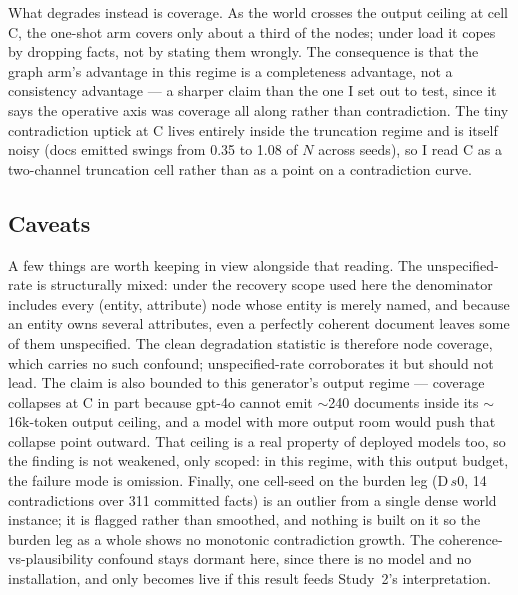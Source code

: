 \documentclass[11pt]{article}
\begin{document}
What degrades instead is coverage. As the world crosses the output ceiling at cell C, the
one-shot arm covers only about a third of the nodes; under load it copes by dropping facts, not
by stating them wrongly. The consequence is that the graph arm's advantage in this regime is a
completeness advantage, not a consistency advantage --- a sharper claim than the one I set out to
test, since it says the operative axis was coverage all along rather than contradiction. The
tiny contradiction uptick at C lives entirely inside the truncation regime and is itself noisy
(docs emitted swings from 0.35 to 1.08 of $N$ across seeds), so I read C as a two-channel
truncation cell rather than as a point on a contradiction curve.

\subsection*{Caveats}
A few things are worth keeping in view alongside that reading. The unspecified-rate is
structurally mixed: under the recovery scope used here the denominator includes every
(entity, attribute) node whose entity is merely named, and because an entity owns several
attributes, even a perfectly coherent document leaves some of them unspecified. The clean
degradation statistic is therefore node coverage, which carries no such confound;
unspecified-rate corroborates it but should not lead. The claim is also bounded to this
generator's output regime --- coverage collapses at C in part because gpt-4o cannot emit
$\sim$240 documents inside its $\sim$16k-token output ceiling, and a model with more output room
would push that collapse point outward. That ceiling is a real property of deployed models too,
so the finding is not weakened, only scoped: in this regime, with this output budget, the failure
mode is omission. Finally, one cell-seed on the burden leg (D\,$s0$, 14 contradictions over 311
committed facts) is an outlier from a single dense world instance; it is flagged rather than
smoothed, and nothing is built on it so the burden leg as a whole shows no monotonic
contradiction growth. The coherence-vs-plausibility confound stays dormant here, since there is
no model and no installation, and only becomes live if this result feeds Study~2's
interpretation.
\end{document}
